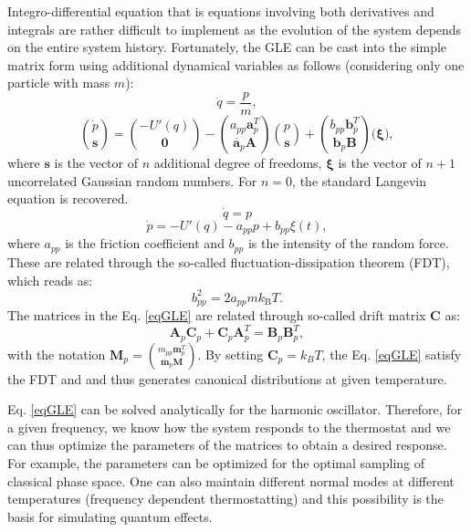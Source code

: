 Integro-differential equation that is equations involving both derivatives and integrals are rather difficult to implement as the evolution of the system depends on the entire system history. Fortunately, the GLE can be cast into the simple matrix form using additional 
dynamical variables as follows (considering only one particle with mass $m$)\cite{Ceriotti2010}:
\begin{equation}
\dot{q}=\frac{p}{m} ,
\label{eqGLE}
\end{equation}
$${\dot{p} \choose \mathbf{s}} = {-U'(q) \choose \mathbf{0}} - 
{a_{pp}  \textbf{a}_p^T  \choose \mathbf{\overline{a}}_p  \mathbf{A}} {p \choose \mathbf{s}} +
{b_{pp}  \mathbf{b}_p^T  \choose \mathbf{{b}}_p  \mathbf{B}}
\Bigg(\mathbf{\xi}\Bigg)   ,$$
where $\mathbf{s}$ is the vector of $n$ additional degree of freedoms, $\mathbf{\xi}$ is the vector of $n+1$ uncorrelated Gaussian random numbers. For $n=0$, the standard Langevin equation is recovered.
\begin{equation}
\dot{q}=p
\label{eqLE}
\end{equation}
$$\dot{p}=-U'(q)-a_{pp}p+b_{pp}\xi(t)  ,$$
where $a_{pp}$ is the friction coefficient and $b_{pp}$ is the intensity of the random force. These are related through the so-called fluctuation-dissipation theorem (FDT), which reads as:
\begin{equation}
b_{pp}^2=2a_{pp}m k_\mathrm{B} T  .
\end{equation}
\noindent
The matrices in the Eq. \ref{eqGLE} are related through so-called drift matrix $\mathbf{C}$ as\cite{Ceriotti2010}:
\begin{equation}
\mathbf{A}_p \mathbf{C}_p+\mathbf{C}_p\mathbf{A}_p^T=\mathbf{B}_p\mathbf{B}_p^T  ,
\label{eqmatrix}
\end{equation}
with the notation $\mathbf{M}_p={m_{pp}  \textbf{m}_p^T  \choose \mathbf{\overline{m}}_p  \mathbf{M}}$. 
By setting $\mathbf{C}_p=k_{B} T$, the Eq. \ref{eqGLE} satisfy the FDT and and thus generates canonical distributions at given temperature.

Eq. \ref{eqGLE} can be solved analytically for the harmonic oscillator. Therefore, for a given frequency, 
we know how the system responds to the thermostat and we can thus optimize the parameters of the matrices to obtain a desired response. 
For example, the parameters can be optimized for the optimal sampling of classical phase space. One can also maintain different normal modes at different temperatures (frequency dependent thermostatting) and this possibility is the basis for simulating quantum effects.

